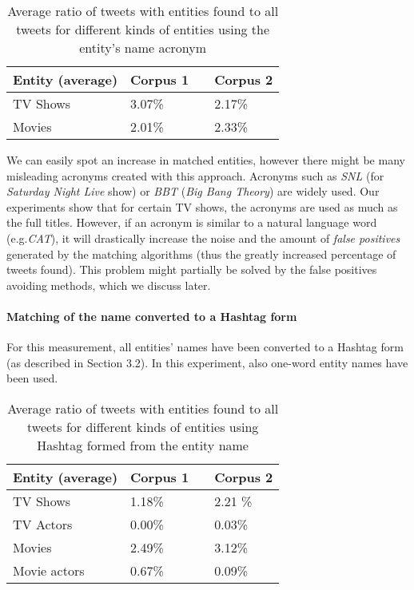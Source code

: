 \begin{table}[h!]
  \begin{center}
    \begin{tabular}{ | p{4cm} | p{2cm} | p{1cm}| p{2cm} | } \hline
      Entity (average) & Corpus 1 & & Corpus 2 \\ \hline
      TV Shows & 3.07\% & & 2.17\% \\ \hline
      Movies & 2.01\% & & 2.33\% \\ \hline
    \end{tabular}
    \caption{Average ratio of tweets with entities found to all tweets for different kinds of entities using the entity's name acronym}
  \end{center}
\end{table}

We can easily spot an increase in matched entities, however there might be many
misleading acronyms created with this approach. Acronyms such as \textit{SNL}
(for \textit{Saturday Night Live} show) or  \textit{BBT} (\textit{Big Bang
Theory}) are widely used. Our experiments show that for certain TV shows, the acronyms
are used as much as the full titles. However,
if an acronym is similar to a natural language word (e.g.\textit{CAT}),
it will drastically increase the noise and the amount of \textit{false positives} generated by the
matching algorithms (thus the greatly increased percentage of tweets found). This problem might
partially be solved by the false positives avoiding methods, which we discuss later.

\paragraph{Matching of the name converted to a Hashtag form}
For this measurement, all entities' names have been converted to a Hashtag form (as described
in Section 3.2). In this experiment, also one-word entity names have been used.

\begin{table}[h!]
  \begin{center}
    \begin{tabular}{ | p{4cm} | p{2cm} | p{1cm}| p{2cm} | } \hline
      Entity (average) & Corpus 1 & & Corpus 2 \\ \hline
      TV Shows & 1.18\% & & 2.21 \% \\ \hline
      TV Actors & 0.00\% & & 0.03\% \\ \hline
      Movies & 2.49\% & & 3.12\% \\ \hline
      Movie actors & 0.67\% & & 0.09\% \\ \hline
    \end{tabular}
    \caption{Average ratio of tweets with entities found to all tweets for different kinds of entities using Hashtag formed from the entity name}
  \end{center}
\end{table}

